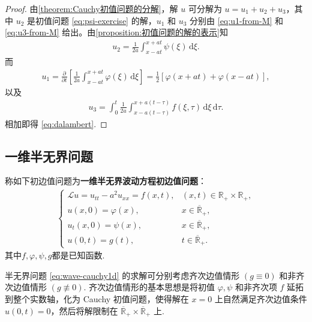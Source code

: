 \documentclass[../../main.tex]{subfiles}%
\begin{document}
\begin{proof}
由\cref{theorem:Cauchy初值问题的分解}，解 $u$ 可分解为 $u=u_1+u_2+u_3$，其中 $u_2$ 是初值问题 \eqref{eq:psi-exercise} 的解，$u_1$ 和 $u_3$ 分别由 \eqref{eq:u1-from-M} 和 \eqref{eq:u3-from-M} 给出。由\cref{proposition:初值问题的解的表示}知
\begin{align*}
u_2=\frac{1}{2a}\int_{x-at}^{x+at}\psi(\xi)\,\mathrm{d}\xi.
\end{align*}
而
\begin{align*}
u_1=\frac{\partial}{\partial t}\left[\frac{1}{2a}\int_{x-at}^{x+at}\varphi(\xi)\,\mathrm{d}\xi\right]
=\frac{1}{2}[\varphi(x+at)+\varphi(x-at)],
\end{align*}
以及
\begin{align*}
u_3=\int_0^t \frac{1}{2a}\int_{x-a(t-\tau)}^{x+a(t-\tau)}f(\xi,\tau)\,\mathrm{d}\xi\,\mathrm{d}\tau.
\end{align*}
相加即得 \eqref{eq:dalambert}.
\end{proof}


\subsection{一维半无界问题}

\begin{definition}
称如下初边值问题为\textbf{一维半无界波动方程初边值问题}：
\begin{align}
\begin{cases}
\mathcal{L}u=u_{tt}-a^2u_{xx}=f(x,t), & (x,t)\in\mathbb{R}_+\times\mathbb{R}_+, \\
u(x,0)=\varphi(x), & x\in\overline{\mathbb{R}}_+, \\
u_t(x,0)=\psi(x), & x\in\overline{\mathbb{R}}_+, \\
u(0,t)=g(t), & t\in\overline{\mathbb{R}}_+.
\end{cases} \label{eq:wave-cauchy1d}
\end{align}
其中$f,\varphi,\psi,g$都是已知函数.
\end{definition}
\begin{remark}
半无界问题 \eqref{eq:wave-cauchy1d} 的求解可分别考虑齐次边值情形 $(g\equiv 0)$ 和非齐次边值情形 $(g\not\equiv 0)$. 齐次边值情形的基本思想是将初值 $\varphi,\psi$ 和非齐次项 $f$ 延拓到整个实数轴，化为 Cauchy 初值问题，使得解在 $x=0$ 上自然满足齐次边值条件 $u(0,t)=0$，然后将解限制在 $\overline{\mathbb{R}}_+\times\overline{\mathbb{R}}_+$ 上.
\end{remark}
\end{document}
